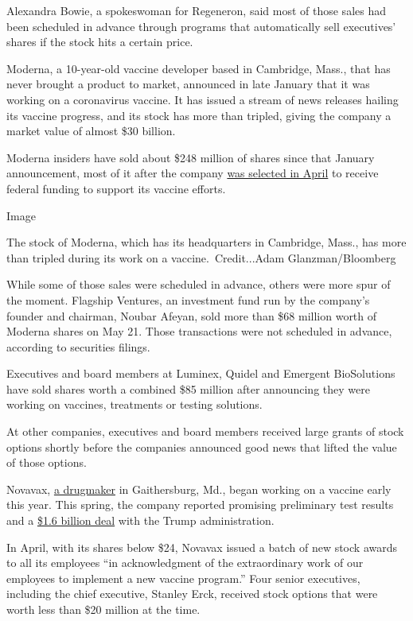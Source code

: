 Alexandra Bowie, a spokeswoman for Regeneron, said most of those sales
had been scheduled in advance through programs that automatically sell
executives' shares if the stock hits a certain price.

Moderna, a 10-year-old vaccine developer based in Cambridge, Mass., that
has never brought a product to market, announced in late January that it
was working on a coronavirus vaccine. It has issued a stream of news
releases hailing its vaccine progress, and its stock has more than
tripled, giving the company a market value of almost \$30 billion.

Moderna insiders have sold about \$248 million of shares since that
January announcement, most of it after the company
\href{https://investors.modernatx.com/news-releases/news-release-details/moderna-announces-award-us-government-agency-barda-483-million}{was
selected in April} to receive federal funding to support its vaccine
efforts.

Image

The stock of Moderna, which has its headquarters in Cambridge, Mass.,
has more than tripled during its work on a vaccine.~Credit...Adam
Glanzman/Bloomberg

While some of those sales were scheduled in advance, others were more
spur of the moment. Flagship Ventures, an investment fund run by the
company's founder and chairman, Noubar Afeyan, sold more than \$68
million worth of Moderna shares on May 21. Those transactions were not
scheduled in advance, according to securities filings.

Executives and board members at Luminex, Quidel and Emergent
BioSolutions have sold shares worth a combined \$85 million after
announcing they were working on vaccines, treatments or testing
solutions.

At other companies, executives and board members received large grants
of stock options shortly before the companies announced good news that
lifted the value of those options.

Novavax,
\href{https://www.nytimes3xbfgragh.onion/2020/07/16/health/coronavirus-vaccine-novavax.html}{a
drugmaker} in Gaithersburg, Md., began working on a vaccine early this
year. This spring, the company reported promising preliminary test
results and a
\href{https://www.nytimes3xbfgragh.onion/2020/07/07/health/novavax-coronavirus-vaccine-warp-speed.html}{\$1.6
billion deal} with the Trump administration.

In April, with its shares below \$24, Novavax issued a batch of new
stock awards to all its employees ``in acknowledgment of the
extraordinary work of our employees to implement a new vaccine
program.'' Four senior executives, including the chief executive,
Stanley Erck, received stock options that were worth less than \$20
million at the time.

